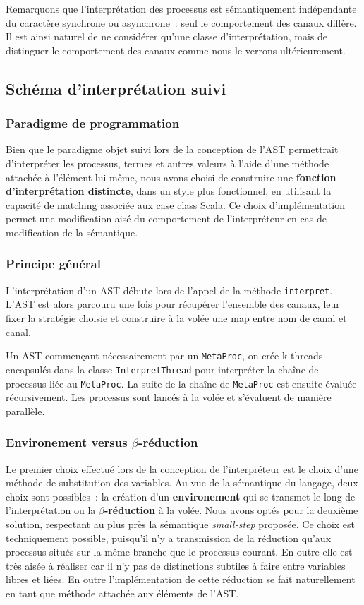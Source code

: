 \documentclass[11pt]{article} %
\begin{document}
Remarquons que l'interprétation des processus est sémantiquement indépendante du caractère synchrone ou asynchrone~: seul le comportement des canaux diffère. Il est ainsi naturel de ne considérer qu'une classe d'interprétation, mais de distinguer le comportement des canaux comme nous le verrons ultérieurement.

\subsection{Schéma d'interprétation suivi}

\subsubsection{Paradigme de programmation}
Bien que le paradigme objet suivi lors de la conception de l'AST permettrait d'interpréter les processus, termes et autres valeurs à l'aide d'une méthode attachée à l'élément lui même, nous avons choisi de construire une \textbf{fonction d'interprétation distincte}, dans un style plus fonctionnel, en utilisant la capacité de matching associée aux case class Scala. Ce choix d'implémentation permet une modification aisé du comportement de l'interpréteur en cas de modification de la sémantique.

\subsubsection{Principe général}
L'interprétation d'un AST débute lors de l'appel de la méthode \texttt{interpret}. L'AST est alors parcouru une fois pour récupérer l'ensemble des canaux, leur fixer la stratégie choisie et construire à la volée une map entre nom de canal et canal.

Un AST commençant nécessairement par un \texttt{MetaProc}, on crée k threads encapsulés dans la classe \texttt{InterpretThread} pour interpréter la chaîne de processus liée au \texttt{MetaProc}. La suite de la chaîne de \texttt{MetaProc} est ensuite évaluée récursivement. Les processus sont lancés à la volée et s'évaluent de manière parallèle.
\subsubsection{Environement versus $\beta$-réduction}
Le premier choix effectué lors de la conception de l'interpréteur est le choix d'une méthode de substitution des variables. Au vue de la sémantique du langage, deux choix sont possibles~: la création d'un \textbf{environement} qui se transmet le long de l'interprétation ou la  \textbf{$\beta$-réduction} à la volée. Nous avons optés pour la deuxième solution, respectant au plus près la sémantique \emph{small-step} proposée.  Ce choix est techniquement possible, puisqu'il n'y a transmission de la réduction qu'aux processus situés sur la même branche que le processus courant. En outre elle est très aisée à réaliser car il n'y pas de distinctions subtiles à faire entre variables libres et liées. En outre l'implémentation de cette réduction se fait naturellement en tant que méthode attachée aux éléments de l'AST.
\end{document}
